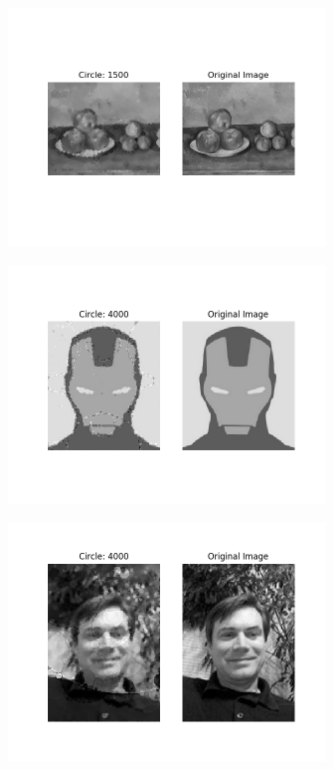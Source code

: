 \documentclass[12pt]{article}
\begin{document}
\begin{figure}[H]
\centering
\noindent\includegraphics[width=0.75\textwidth]{../results/fruit/fruit2_1500}
\end{figure}
\begin{figure}[H]
\centering
\noindent\includegraphics[width=0.75\textwidth]{../results/ironman/ironman_4000}
\end{figure}
\begin{figure}[H]
\centering
\noindent\includegraphics[width=0.75\textwidth]{../results/jmcgough/jmcgough_4000}
\end{figure}
\end{document}
